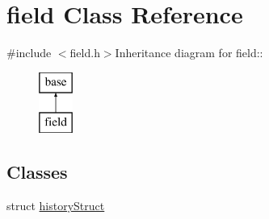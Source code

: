 \hypertarget{classfield}{
\section{field Class Reference}
\label{classfield}
}


{\ttfamily \#include $<$field.h$>$}Inheritance diagram for field::\begin{figure}[H]
\begin{center}
\leavevmode
\includegraphics[height=2cm]{classfield}
\end{center}
\end{figure}
\subsection*{Classes}
\begin{DoxyCompactItemize}
\item 
struct \hyperlink{structfield_1_1history_struct}{historyStruct}
\end{DoxyCompactItemize}
